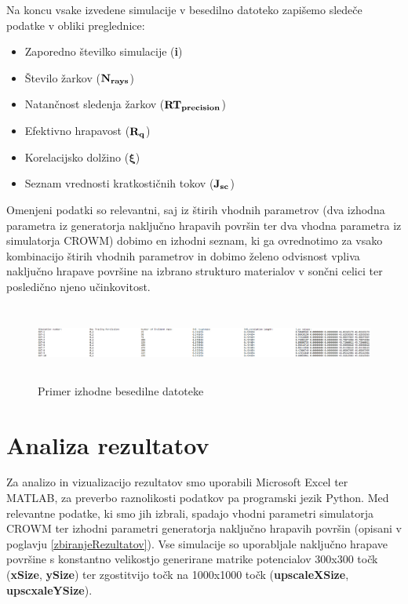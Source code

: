 \documentclass[a4paper,twoside,openright,12pt,slovene]{book}
\begin{document}
Na koncu vsake izvedene simulacije v besedilno datoteko zapišemo sledeče podatke v obliki preglednice:
\begin{itemize}
    \setlength\itemsep{0.1em}
    \item Zaporedno številko simulacije (\textbf{i})
    \item Število žarkov ($\bf N_{rays}$)
    \item Natančnost sledenja žarkov ($\bf RT_{precision}$)
    \item Efektivno hrapavost ($\bf R_q$)
    \item Korelacijsko dolžino ($\boldsymbol{\xi}$)
    \item Seznam vrednosti kratkostičnih tokov ($\bf J_{sc}$)
\end{itemize}

Omenjeni podatki so relevantni, saj iz štirih vhodnih parametrov (dva izhodna parametra iz generatorja naključno hrapavih površin ter dva vhodna parametra iz simulatorja CROWM) dobimo en izhodni seznam, ki ga ovrednotimo za vsako kombinacijo štirih vhodnih parametrov in dobimo želeno odvisnost vpliva naključno hrapave površine na izbrano strukturo materialov v sončni celici ter posledično njeno učinkovitost. \\

\begin{figure}[h]
    \centering
    \includegraphics[width=150mm, height=25mm]{Slike/izhodna tabela.png}
    \caption{Primer izhodne besedilne datoteke}
    \label{fig:my_label}
\end{figure}


\chapter{Analiza rezultatov}

Za analizo in vizualizacijo rezultatov smo uporabili Microsoft Excel ter MATLAB, za preverbo raznolikosti podatkov pa programski jezik Python. Med relevantne podatke, ki smo jih izbrali, spadajo vhodni parametri simulatorja CROWM ter izhodni parametri generatorja naključno hrapavih površin (opisani v poglavju \ref{zbiranjeRezultatov}). Vse simulacije so uporabljale naključno hrapave površine s konstantno velikostjo generirane matrike potencialov 300x300 točk (\textbf{xSize}, \textbf{ySize}) ter zgostitvijo točk na 1000x1000 točk (\textbf{upscaleXSize}, \textbf{upscxaleYSize}). 
\end{document}
